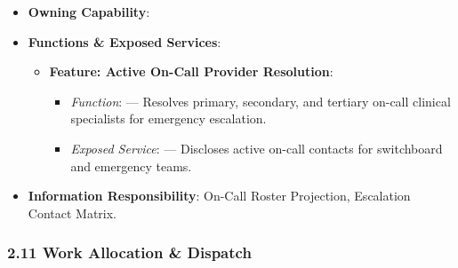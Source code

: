 \begin{itemize}

\item
\textbf{Owning Capability}: \texttt{}



\item
\textbf{Functions \& Exposed Services}:


\begin{itemize}

\item
\textbf{Feature: Active On-Call Provider Resolution}:


\begin{itemize}

\item
\emph{Function}: \texttt{} — Resolves primary, secondary, and tertiary on-call clinical specialists for emergency escalation.



\item
\emph{Exposed Service}: \texttt{} — Discloses active on-call contacts for switchboard and emergency teams.



\end{itemize}


\end{itemize}


\item
\textbf{Information Responsibility}: On-Call Roster Projection, Escalation Contact Matrix.



\end{itemize}
\label{rad:hso:218}

\par\smallskip
{}\label{rad:hso:220}
\subsubsection*{2.11 Work Allocation \& Dispatch}
\label{rad:hso:221}


